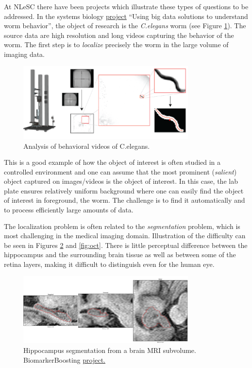  At NLeSC there have been projects which illustrate these types of questions to be addressed. In the systems biology  \href{https://blog.surf.nl/en/eyr4-blog-5-using-big-data-solutions-to-understand-worm-behavior/}{project} ``Using big data solutions to understand worm behavior'', the object of research is the {\em C.elegans} worm (see Figure \ref{fig:Celegans}). The source data are high resolution and long videos capturing the behavior of the worm. The first step is to {\em localize} precisely the worm in the large volume of imaging data. 
\begin{figure}[H]
\begin{center}
\includegraphics[width=0.8\textwidth]{fig/Celegans}
\end{center}
\caption{Analysis of behavioral videos of C.elegans.}
\label{fig:Celegans}
\end{figure}
This is a good example of how the object of interest is often studied in a controlled environment and one can assume that the most prominent ({\em salient}) object captured on images/videos is the object of interest. In this case, the lab plate ensures relatively uniform background where one can easily find the object of interest in foreground, the worm. The challenge is to find it automatically and to process efficiently large amounts of data.

The localization problem is often related to the {\em segmentation} problem, which is most challenging in the medical imaging domain. Illustration of the difficulty can be seen in Figures \ref{fig:hippo} and \ref{fig:oct}. There is little perceptual difference between the hippocampus and the surrounding brain tissue as well as between some of the retina layers, making it difficult to distinguish even for the human eye.

\begin{figure}[H]
\begin{center}
\includegraphics[width=0.8\textwidth]{fig/hippo}
\end{center}
\caption{Hippocampus segmentation from a brain MRI subvolume. BiomarkerBoosting \href{https://www.esciencecenter.nl/project/biomarker-boosting}{\underline{project.}}}
\label{fig:hippo}
\end{figure}


